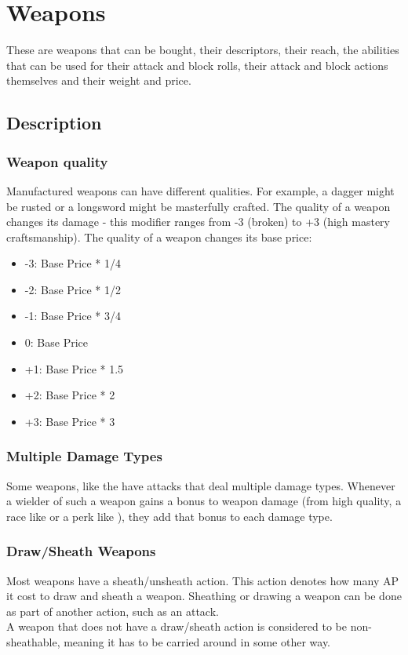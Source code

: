 \chapter{Weapons}\label{ch:weapons}
These are weapons that can be bought, their descriptors, their reach, the abilities that can be used for their attack and block rolls, their attack and block actions themselves and their weight and price.\\
\section{Description}\label{sec:weaponDescription}
\subsection{Weapon quality}\label{subsec:weaponQuality}
Manufactured weapons can have different qualities.
For example, a dagger might be rusted or a longsword might be masterfully crafted.
The quality of a weapon changes its damage - this modifier ranges from -3 (broken) to +3 (high mastery craftsmanship).
The quality of a weapon changes its base price:\\

\begin{itemize}
    \item -3: Base Price * 1/4
    \item -2: Base Price * 1/2
    \item -1: Base Price * 3/4
    \item 0: Base Price
    \item +1: Base Price * 1.5
    \item +2: Base Price * 2
    \item +3: Base Price * 3
\end{itemize}

\subsection{Multiple Damage Types}\label{subsec:multipleDamageTypeWeapons}
Some weapons, like the  have attacks that deal multiple damage types.
Whenever a wielder of such a weapon gains a bonus to weapon damage (from high quality, a race like  or a perk like ), they add that bonus to each damage type.

\subsection{Draw/Sheath Weapons}\label{subsec:drawWeapons}
Most weapons have a sheath/unsheath action.
This action denotes how many AP it cost to draw and sheath a weapon.
Sheathing or drawing a weapon can be done as part of another action, such as an attack.\\
A weapon that does not have a draw/sheath action is considered to be non-sheathable, meaning it has to be carried around in some other way.

